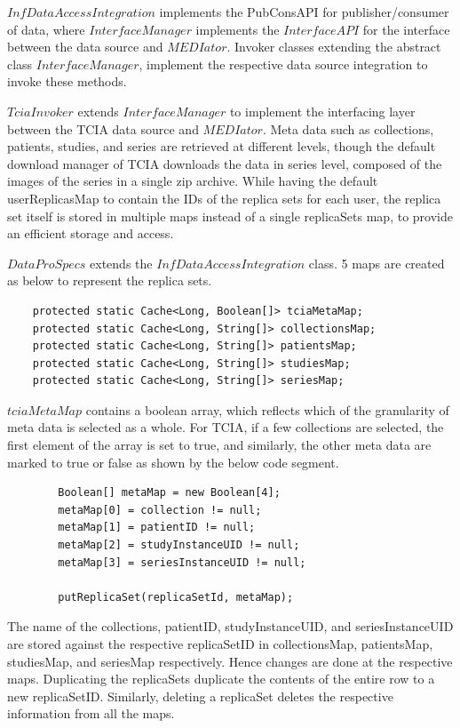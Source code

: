 \documentclass[conference]{IEEEtran}
\begin{document}
$InfDataAccessIntegration$ implements the PubConsAPI for publisher/consumer of data, where $InterfaceManager$ implements the $InterfaceAPI$ for the interface between the data source and $MEDIator$. Invoker classes extending the abstract class $InterfaceManager$, implement the respective data source integration to invoke these methods. 

$TciaInvoker$ extends $InterfaceManager$ to implement the interfacing layer between the TCIA data source and $MEDIator$. Meta data such as collections, patients, studies, and series are retrieved at different levels, though the default download manager of TCIA downloads the data in series level, composed of the images of the series in a single zip archive. While having the default userReplicasMap to contain the IDs of the replica sets for each user, the replica set itself is stored in multiple maps instead of a single replicaSets map, to provide an efficient storage and access.

$DataProSpecs$ extends the $InfDataAccessIntegration$ class. 5 maps are created as below to represent the replica sets.
\begin{lstlisting}  
    protected static Cache<Long, Boolean[]> tciaMetaMap;
    protected static Cache<Long, String[]> collectionsMap;
    protected static Cache<Long, String[]> patientsMap;
    protected static Cache<Long, String[]> studiesMap;
    protected static Cache<Long, String[]> seriesMap;
\end{lstlisting} 

$tciaMetaMap$ contains a boolean array, which reflects which of the granularity of meta data is selected as a whole. For TCIA, if a few collections are selected, the first element of the array is set to true, and similarly, the other meta data are marked to true or false as shown by the below code segment.
\begin{lstlisting}  
        Boolean[] metaMap = new Boolean[4];
        metaMap[0] = collection != null;
        metaMap[1] = patientID != null;
        metaMap[2] = studyInstanceUID != null;
        metaMap[3] = seriesInstanceUID != null;

        putReplicaSet(replicaSetId, metaMap);
\end{lstlisting} 
The name of the collections, patientID, studyInstanceUID, and seriesInstanceUID are stored against the respective replicaSetID in collectionsMap, patientsMap, studiesMap, and seriesMap respectively. Hence changes are done at the respective maps. Duplicating the replicaSets duplicate the contents of the entire row to a new replicaSetID. Similarly, deleting a replicaSet deletes the respective information from all the maps.
\end{document}
